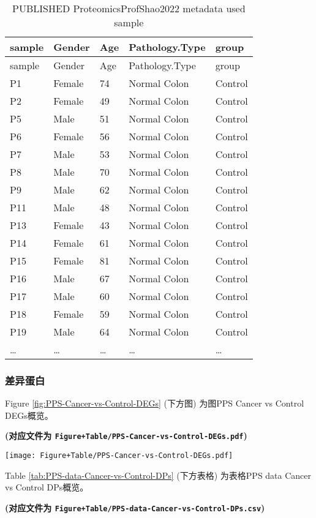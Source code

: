 \documentclass[
]{article}
\begin{document}
\begin{longtable}[]{@{}lllll@{}}
\caption{\label{tab:PUBLISHED-ProteomicsProfShao2022-metadata-used-sample}PUBLISHED ProteomicsProfShao2022 metadata used sample}\tabularnewline
\toprule
sample & Gender & Age & Pathology.Type & group\tabularnewline
\midrule
\endfirsthead
\toprule
sample & Gender & Age & Pathology.Type & group\tabularnewline
\midrule
\endhead
P1 & Female & 74 & Normal Colon & Control\tabularnewline
P2 & Female & 49 & Normal Colon & Control\tabularnewline
P5 & Male & 51 & Normal Colon & Control\tabularnewline
P6 & Female & 56 & Normal Colon & Control\tabularnewline
P7 & Male & 53 & Normal Colon & Control\tabularnewline
P8 & Male & 70 & Normal Colon & Control\tabularnewline
P9 & Male & 62 & Normal Colon & Control\tabularnewline
P11 & Male & 48 & Normal Colon & Control\tabularnewline
P13 & Female & 43 & Normal Colon & Control\tabularnewline
P14 & Female & 61 & Normal Colon & Control\tabularnewline
P15 & Female & 81 & Normal Colon & Control\tabularnewline
P16 & Male & 67 & Normal Colon & Control\tabularnewline
P17 & Male & 60 & Normal Colon & Control\tabularnewline
P18 & Female & 59 & Normal Colon & Control\tabularnewline
P19 & Male & 64 & Normal Colon & Control\tabularnewline
\ldots{} & \ldots{} & \ldots{} & \ldots{} & \ldots{}\tabularnewline
\bottomrule
\end{longtable}

\hypertarget{ux5deeux5f02ux86cbux767d}{%
\subsubsection{差异蛋白}\label{ux5deeux5f02ux86cbux767d}}

Figure \ref{fig:PPS-Cancer-vs-Control-DEGs} (下方图) 为图PPS Cancer vs Control DEGs概览。

\textbf{(对应文件为 \texttt{Figure+Table/PPS-Cancer-vs-Control-DEGs.pdf})}

\def\@captype{figure}
\begin{center}
\texttt{[image: Figure+Table/PPS-Cancer-vs-Control-DEGs.pdf]}
\caption{PPS Cancer vs Control DEGs}\label{fig:PPS-Cancer-vs-Control-DEGs}
\end{center}

Table \ref{tab:PPS-data-Cancer-vs-Control-DPs} (下方表格) 为表格PPS data Cancer vs Control DPs概览。

\textbf{(对应文件为 \texttt{Figure+Table/PPS-data-Cancer-vs-Control-DPs.csv})}
\end{document}
